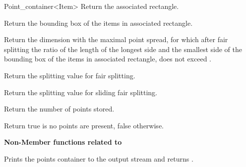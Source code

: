 \begin{ccRefClass}{Point_container<Item>}
{Return the associated rectangle.}

{Return the bounding box of the items in associated rectangle.}

{Return the dimension with the maximal point spread, for which after fair splitting
the ratio of the length of the longest side and the smallest side of the bounding box of
the items in associated rectangle,
does not exceed .}

{Return the splitting value for fair splitting.}

{Return the splitting value for sliding fair splitting.}

{
Return the number of points stored.
}

{
Return true is no points are present, false otherwise.
}




{\bf Non-Member functions related to }

\ccGlueBegin
{}
{Prints the points container  to the output stream  and returns .}
\ccGlueEnd

\end{ccRefClass}


